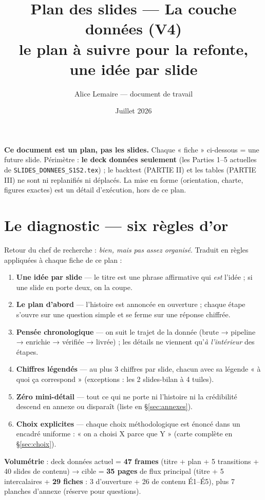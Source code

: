 \documentclass[11pt,a4paper]{article}
\title{\vspace{-8mm}\textbf{Plan des slides --- La couche données (V4)}\\[2mm]
  \large le plan à suivre pour la refonte, une idée par slide}
\author{Alice Lemaire --- document de travail}
\date{Juillet 2026}
\newcommand{\co}[1]{\texttt{#1}}
\begin{document}
\maketitle
\vspace{-6mm}
\noindent\colorbox{grisC!10}{\parbox{\dimexpr\linewidth-8pt}{\small
\textbf{Ce document est un plan, pas les slides.} Chaque « fiche » ci-dessous = une future
slide. Périmètre : \textbf{le deck données seulement} (les Parties 1--5 actuelles de
\co{SLIDES\_DONNEES\_S1S2.tex}) ; le backtest (PARTIE II) et les tables (PARTIE III) ne sont
ni replanifiés ni déplacés. La mise en forme (orientation, charte, figures exactes) est un
détail d'exécution, hors de ce plan.}}

\section{Le diagnostic --- six règles d'or}

Retour du chef de recherche : \emph{bien, mais pas assez organisé}. Traduit en règles
appliquées à chaque fiche de ce plan :

\begin{enumerate}[itemsep=1pt, topsep=3pt]
  \item \textbf{Une idée par slide} --- le titre est une phrase affirmative qui \emph{est}
        l'idée ; si une slide en porte deux, on la coupe.
  \item \textbf{Le plan d'abord} --- l'histoire est annoncée en ouverture ; chaque étape
        s'ouvre sur une question simple et se ferme sur une réponse chiffrée.
  \item \textbf{Pensée chronologique} --- on suit le trajet de la donnée (brute → pipeline →
        enrichie → vérifiée → livrée) ; les détails ne viennent qu'\emph{à l'intérieur} des étapes.
  \item \textbf{Chiffres légendés} --- au plus 3 chiffres par slide, chacun avec sa légende
        « à quoi ça correspond » (exceptions : les 2 slides-bilan à 4 tuiles).
  \item \textbf{Zéro mini-détail} --- tout ce qui ne porte ni l'histoire ni la crédibilité
        descend en annexe ou disparaît (liste en §\ref{sec:annexes}).
  \item \textbf{Choix explicites} --- chaque choix méthodologique est énoncé dans un encadré
        uniforme : « on a choisi X parce que Y » (carte complète en §\ref{sec:choix}).
\end{enumerate}

\noindent\textbf{Volumétrie} : deck données actuel = \textbf{47 frames} (titre + plan +
5 transitions + 40 slides de contenu) → cible = \textbf{35 pages} de flux principal
(titre + 5 intercalaires + \textbf{29 fiches} : 3 d'ouverture + 26 de contenu É1--É5),
plus 7 planches d'annexe (réserve pour questions).
\end{document}
